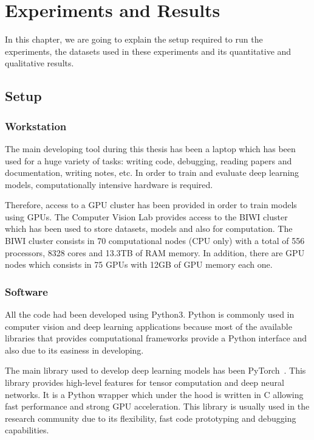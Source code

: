 
\chapter{Experiments and Results}
\label{cha:experimentsandresults}

In this chapter, we are going to explain the setup required to run the experiments,
the datasets used in these experiments and its quantitative and qualitative results.

\section{Setup}
\subsection{Workstation}

The main developing tool during this thesis has been a laptop which has been used for a huge variety of tasks: writing code, debugging, reading papers and documentation, writing notes, etc.
In order to train and evaluate deep learning models, computationally intensive hardware is required.

Therefore, access to a GPU cluster has been provided in order to train models using GPUs.
The Computer Vision Lab provides access to the BIWI cluster which has been used to store datasets, models and also for computation.
The BIWI cluster consists in 70 computational nodes (CPU only) with a total of 556 processors, 8328 cores and 13.3TB of RAM memory.
In addition, there are GPU nodes which consists in 75 GPUs with 12GB of GPU memory each one.

\subsection{Software}

All the code had been developed using Python3.
Python is commonly used in computer vision and deep learning applications because most of the available libraries that provides computational frameworks provide a Python interface and also due to its easiness in developing.

The main library used to develop deep learning models has been PyTorch~\pytorch.
This library provides high-level features for tensor computation and deep neural networks.
It is a Python wrapper which under the hood is written in C allowing fast performance and strong GPU acceleration.
This library is usually used in the research community due to its flexibility, fast code prototyping and debugging capabilities.


